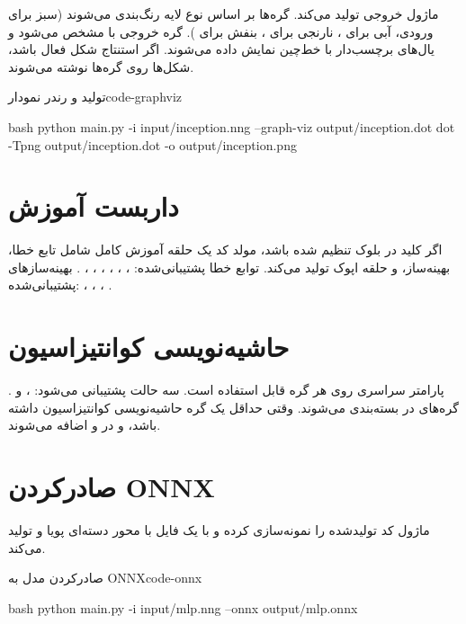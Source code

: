 \documentclass{nngraph-fa}
\begin{document}
ماژول  خروجی  تولید می‌کند.
گره‌ها بر اساس نوع لایه رنگ‌بندی می‌شوند (سبز برای ورودی، آبی
برای ، نارنجی برای ، بنفش برای
). گره خروجی با  مشخص می‌شود
و یال‌های برچسب‌دار با خط‌چین نمایش داده می‌شوند. اگر استنتاج شکل
فعال باشد، شکل‌ها روی گره‌ها نوشته می‌شوند.

\begin{codebox}{تولید و رندر نمودار}{code-graphviz}
\begin{amzcode}{bash}
python main.py -i input/inception.nng --graph-viz output/inception.dot
dot -Tpng output/inception.dot -o output/inception.png
\end{amzcode}
\end{codebox}

\section{داربست آموزش}

اگر کلید  در بلوک  تنظیم شده باشد، مولد
کد یک حلقه آموزش کامل شامل تابع خطا، بهینه‌ساز، و حلقه اپوک
تولید می‌کند. توابع خطا پشتیبانی‌شده:
، ، ،
، ، ،
. بهینه‌سازهای پشتیبانی‌شده:
، ، ، .

\section{حاشیه‌نویسی کوانتیزاسیون}

پارامتر سراسری  روی هر گره قابل استفاده است.
سه حالت پشتیبانی می‌شود: ،  و
. گره‌های  در 
بسته‌بندی می‌شوند. وقتی حداقل یک گره حاشیه‌نویسی کوانتیزاسیون
داشته باشد،  و  در
 و  اضافه می‌شوند.

\section{صادرکردن ONNX}

ماژول  کد تولیدشده را نمونه‌سازی کرده و با
 یک فایل  با محور دسته‌ای پویا
و  تولید می‌کند.

\begin{codebox}{صادرکردن مدل به ONNX}{code-onnx}
\begin{amzcode}{bash}
python main.py -i input/mlp.nng --onnx output/mlp.onnx
\end{amzcode}
\end{codebox}
\end{document}
